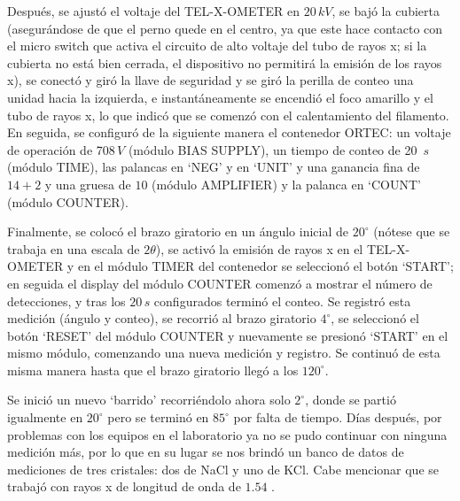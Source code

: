Después, se ajustó el voltaje del TEL-X-OMETER en $20\,kV$, se bajó la cubierta (asegurándose de que el perno quede en el centro, ya que este hace contacto con el micro switch que activa el circuito de alto voltaje del tubo de rayos x; si la cubierta no está bien cerrada, el dispositivo no permitirá la emisión de los rayos x), se conectó y giró la llave de seguridad y se giró la perilla de conteo una unidad hacia la izquierda, e instantáneamente se encendió el foco amarillo y el tubo de rayos x, lo que indicó que se comenzó con el calentamiento del filamento. En seguida, se configuró de la siguiente manera el contenedor ORTEC: un voltaje de operación de 708$\,V$ (módulo BIAS SUPPLY), un tiempo de conteo de 20 $\,s$ (módulo TIME), las palancas en \enquote*{NEG} y en \enquote*{UNIT} y una ganancia fina de $14+2$ y una gruesa de $10$ (módulo AMPLIFIER) y la palanca en \enquote*{COUNT} (módulo COUNTER).

Finalmente, se colocó el brazo giratorio en un ángulo inicial de $20^\circ$ (nótese que se trabaja en una escala de $2\theta$), se activó la emisión de rayos x en el TEL-X-OMETER y en el módulo TIMER del contenedor se seleccionó el botón \enquote*{START}; en seguida el display del módulo COUNTER comenzó a mostrar el número de detecciones, y tras los $20\,s$ configurados terminó el conteo. Se registró esta medición (ángulo y conteo), se recorrió al brazo giratorio $4^\circ$, se seleccionó el botón \enquote*{RESET} del módulo COUNTER y nuevamente se presionó \enquote*{START} en el mismo módulo, comenzando una nueva medición y registro. Se continuó de esta misma manera hasta que el brazo giratorio llegó a los $120^\circ$.

Se inició un nuevo \enquote*{barrido} recorriéndolo ahora solo $2^\circ$, donde se partió igualmente en $20^\circ$ pero se terminó en $85^\circ$ por falta de tiempo. Días después, por problemas con los equipos en el laboratorio ya no se pudo continuar con ninguna medición más, por lo que en su lugar se nos brindó un banco de datos de mediciones de tres cristales: dos de NaCl y uno de KCl. Cabe mencionar que se trabajó con rayos x de longitud de onda de $1.54$ \text{\AA}. \cite{Manual_TEL-X-OMETER}